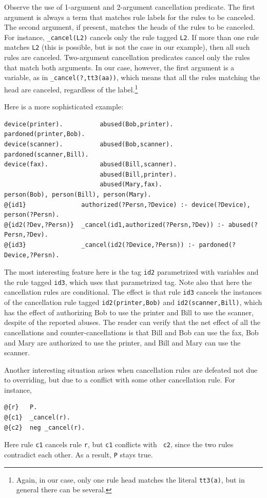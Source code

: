 \documentclass[11pt]{article}
\begin{document}
Observe the use of 1-argument and 2-argument cancellation predicate.
The first argument is always a term that matches rule labels for the rules
to be canceled. The second
argument, if present, matches the heads of the rules to be canceled. For
instance, {\tt \_cancel(L2)} cancels only the rule tagged {\tt L2}. If more
than one rule matches {\tt L2} (this is possible, but is not the case in
our example), then all such rules are canceled. Two-argument cancellation
predicates cancel only the rules that match both arguments. In our case,
however, the first argument is a variable, as in {\tt \_cancel(?,tt3(aa))},
which means that all the rules matching the head are canceled, regardless
of the label.\footnote{
  Again, in our case, only one rule head matches the literal {\tt tt3(a)},
  but in general there can be several.
}

Here is a more sophisticated example:
\begin{verbatim}
device(printer).          abused(Bob,printer).       pardoned(printer,Bob).
device(scanner).          abused(Bob,scanner).       pardoned(scanner,Bill).
device(fax).              abused(Bill,scanner).
                          abused(Bill,printer).
                          abused(Mary,fax).
person(Bob), person(Bill), person(Mary).
@{id1}               authorized(?Persn,?Device) :- device(?Device), person(?Persn).
@{id2(?Dev,?Persn)}  _cancel(id1,authorized(?Persn,?Dev)) :- abused(?Persn,?Dev).
@{id3}               _cancel(id2(?Device,?Persn)) :- pardoned(?Device,?Persn).
\end{verbatim}
The most interesting feature here is the tag {\tt id2} parametrized with
variables and the rule tagged {\tt id3}, which uses that parametrized
tag. Note also that here the cancellation rules are conditional.
The effect is that rule {\tt id3} cancels the instances 
of the cancellation rule tagged {\tt id2(printer,Bob)} and
{\tt id2(scanner,Bill)}, which has the effect of authorizing Bob to use the
printer and Bill to use the scanner, despite of the reported abuses.  
The reader can verify that the net effect of all the cancellations and
counter-cancellations is that Bill and Bob can use the fax, Bob and Mary
are authorized to use the printer, and Bill and Mary can use the scanner.

Another interesting situation arises when cancellation rules are defeated
not due to overriding, but due to a conflict with some other cancellation
rule. For instance,
\begin{verbatim}
@{r}   P.
@{c1}  _cancel(r).
@{c2}  neg _cancel(r).
\end{verbatim}
Here rule {\tt c1} cancels rule {\tt r}, but {\tt c1} conflicts with {\tt
  c2}, since the two rules contradict each other. As a result, {\tt P}      
stays true.
\end{document}
